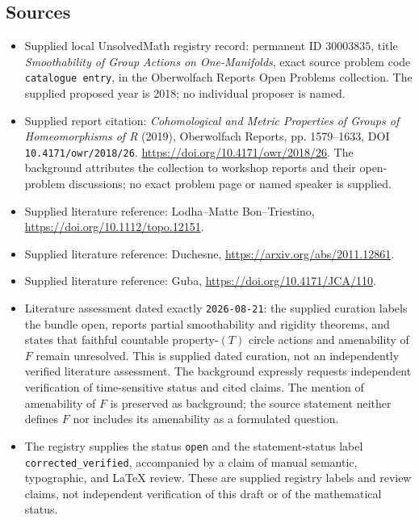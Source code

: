 \documentclass[11pt]{article}
\begin{document}
\subsection{Sources}
\begin{itemize}
\item Supplied local UnsolvedMath registry record: permanent ID \(30003835\), title \emph{Smoothability of Group Actions on One-Manifolds}, exact source problem code \texttt{catalogue entry}, in the Oberwolfach Reports Open Problems collection. The supplied proposed year is 2018; no individual proposer is named.
\item Supplied report citation: \emph{Cohomological and Metric Properties of Groups of Homeomorphisms of R} (2019), Oberwolfach Reports, pp. 1579--1633, DOI \texttt{10.4171/owr/2018/26}. \url{https://doi.org/10.4171/owr/2018/26}. The background attributes the collection to workshop reports and their open-problem discussions; no exact problem page or named speaker is supplied.
\item Supplied literature reference: Lodha--Matte Bon--Triestino, \url{https://doi.org/10.1112/topo.12151}.
\item Supplied literature reference: Duchesne, \url{https://arxiv.org/abs/2011.12861}.
\item Supplied literature reference: Guba, \url{https://doi.org/10.4171/JCA/110}.
\item Literature assessment dated exactly \texttt{2026-08-21}: the supplied curation labels the bundle open, reports partial smoothability and rigidity theorems, and states that faithful countable property-\((T)\) circle actions and amenability of \(F\) remain unresolved. This is supplied dated curation, not an independently verified literature assessment. The background expressly requests independent verification of time-sensitive status and cited claims. The mention of amenability of \(F\) is preserved as background; the source statement neither defines \(F\) nor includes its amenability as a formulated question.
\item The registry supplies the status \texttt{open} and the statement-status label \texttt{corrected\_verified}, accompanied by a claim of manual semantic, typographic, and LaTeX review. These are supplied registry labels and review claims, not independent verification of this draft or of the mathematical status.
\end{itemize}
\end{document}
